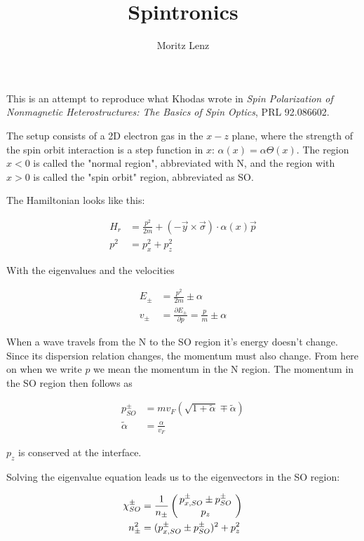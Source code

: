 \documentclass[11pt]{article}
\author{Moritz Lenz}
\title{Spintronics}
\newcommand{\inp}[1]{\ensuremath{\left(#1\right)}}
\newcommand{\vect}[2]{\ensuremath{\inp{\hspace{-.8ex}\begin{array}{c}#1\\#2\end{array}\hspace{-.4ex}}}}
\begin{document}
\maketitle

This is an attempt to reproduce what Khodas wrote in {\em Spin 
Polarization of Nonmagnetic Heterostructures: The Basics of Spin
Optics}, PRL 92.086602.

The setup consists of a 2D electron gas in the $x-z$ plane, where the
strength of the spin orbit interaction is a step function in $x$:
$\alpha(x) = \alpha \Theta(x)$. The region $x < 0$ is called the
"normal region", abbreviated with N, and the region with $x > 0$ is
called the "spin orbit" region, abbreviated as SO.

The Hamiltonian looks like this:

\begin{align}
    H_r &= \frac{p^2}{2m} + (-\vec y \times \vec \sigma) \cdot
            \alpha(x) \vec p\\ 
    p^2 &= p_x^2 + p_z^2
\end{align}

With the eigenvalues and the velocities

\begin{align}
    E_{\pm} &= \frac{p^2}{2m} \pm \alpha \\
    v_{\pm} &= \frac{\partial E_{\pm}}{\partial p} = \frac{p}{m} \pm \alpha
\end{align}

When a wave travels from the N to the SO region it's energy doesn't
change. Since its dispersion relation changes, the momentum must also
change. From here on when we write $p$ we mean the momentum in the N
region. The momentum in the SO region then follows as

\begin{align*}
    p_{SO}^{\pm} &= m v_F (\sqrt{1 + \tilde \alpha} \mp \tilde \alpha)\\
    \tilde\alpha &= \frac{\alpha}{v_F}
\end{align*}

$p_z$ is conserved at the interface.

Solving the eigenvalue equation leads us to the eigenvectors in the SO
region:

\begin{align*}
   \chi_{SO}^{\pm} &= \frac{1}{n_{\pm}} 
                      \vect{p_{x,SO}^{\pm} \pm p_{SO}^\pm}{p_z} \\
    n_{\pm}^2      &= (p_{x,SO}^{\pm} \pm p_{SO}^\pm)^2 + p_z^2
\end{align*}
\end{document}

